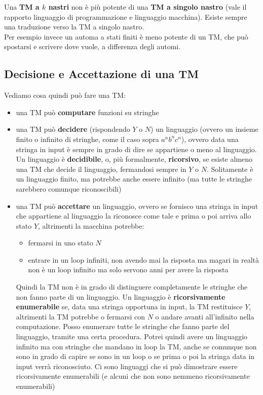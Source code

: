 Una \textbf{TM a $k$ nastri} non è più potente di una \textbf{TM a singolo
  nastro} (vale il rapporto linguaggio di programmazione e linguaggio
macchina). Esiste sempre una traduzione verso la TM a singolo nastro.\\
Per esempio invece un automa a stati finiti è meno potente di un TM, che può
spostarsi e scrivere dove vuole, a differenza degli automi.\\
\subsection{Decisione e Accettazione di una TM}
Vediamo cosa quindi può fare una TM:
\begin{itemize}
  \item una TM può \textbf{computare} funzioni su stringhe
  \item una TM può \textbf{decidere} (rispondendo $Y$ o $N$) un linguaggio
  (ovvero un insieme finito o infinito di stringhe, come il caso sopra
  $a^nb^nc^n$), ovvero data una stringa in input è sempre in grado di dire se
  appartiene o meno al linguaggio. Un linguaggio è \textbf{decidibile}, o, più
  formalmente, \textbf{ricorsivo}, se esiste
  almeno una TM che decide il linguaggio, fermandosi sempre in $Y$ o
  $N$. Solitamente è un linguaggio finito, ma potrebbe anche essere infinito (ma
  tutte le stringhe sarebbero comunque riconoscibili)
  \item una TM può \textbf{accettare} un linguaggio, ovvero se fornisco una
  stringa in input che appartiene al linguaggio la riconosce come tale e prima o
  poi arriva allo stato $Y$, altrimenti la macchina potrebbe:
  \begin{itemize}
    \item fermarsi in uno stato $N$
    \item entrare in un loop infiniti, non avendo mai la risposta ma magari in
    realtà non è un loop infinito ma solo servono anni per avere la risposta
  \end{itemize}
  Quindi la TM non è in grado di distinguere completamente le stringhe che non
  fanno parte di un linguaggio. Un linguaggio è \textbf{ricorsivamente enumerabile} se, data una stringa opportuna in
  input, la TM restituisce $Y$, altrimenti la TM potrebbe o fermarsi con $N$ o andare
  avanti all'infinito nella computazione. Posso enumerare tutte le stringhe che
  fanno parte del linguaggio, tramite una certa procedura. Potrei quindi avere
  un linguaggio infinito ma con 
  stringhe che mandano in loop la TM, anche se comunque non sono in grado di
  capire se sono in un loop o se prima o poi la stringa data in input verrà
  riconosciuto. Ci sono linguaggi che si può dimostrare 
  essere ricorsivamente enumerabili (e alcuni che non sono nemmeno
  ricorsivamente enumerabili)
\end{itemize}
